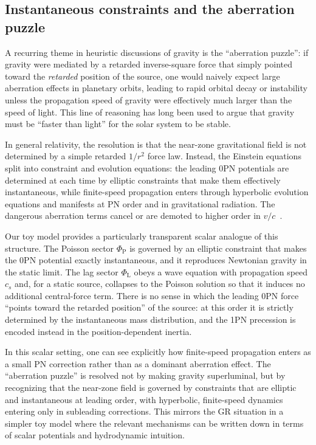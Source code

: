 \documentclass[11pt]{article}
\newcommand{\cS}{c_s}
\newcommand{\PhiP}{\Phi_{\mathrm{P}}}
\newcommand{\PhiL}{\Phi_{\mathrm{L}}}
\begin{document}
\subsection{Instantaneous constraints and the aberration puzzle}
\label{sec:discussion_aberration}

A recurring theme in heuristic discussions of gravity is the ``aberration puzzle'': if gravity were mediated by a retarded inverse-square force that simply pointed toward the \emph{retarded} position of the source, one would naively expect large aberration effects in planetary orbits, leading to rapid orbital decay or instability unless the propagation speed of gravity were effectively much larger than the speed of light. This line of reasoning has long been used to argue that gravity must be ``faster than light'' for the solar system to be stable.

In general relativity, the resolution is that the near-zone gravitational field is not determined by a simple retarded $1/r^2$ force law. Instead, the Einstein equations split into constraint and evolution equations: the leading 0PN potentials are determined at each time by elliptic constraints that make them effectively instantaneous, while finite-speed propagation enters through hyperbolic evolution equations and manifests at PN order and in gravitational radiation. The dangerous aberration terms cancel or are demoted to higher order in $v/c$~\cite{Carlip:2000jd}.

Our toy model provides a particularly transparent scalar analogue of this structure. The Poisson sector $\PhiP$ is governed by an elliptic constraint that makes the 0PN potential exactly instantaneous, and it reproduces Newtonian gravity in the static limit. The lag sector $\PhiL$ obeys a wave equation with propagation speed $\cS$ and, for a static source, collapses to the Poisson solution so that it induces no additional central-force term. There is no sense in which the leading 0PN force ``points toward the retarded position'' of the source: at this order it is strictly determined by the instantaneous mass distribution, and the 1PN precession is encoded instead in the position-dependent inertia.

In this scalar setting, one can see explicitly how finite-speed propagation enters as a small PN correction rather than as a dominant aberration effect. The ``aberration puzzle'' is resolved not by making gravity superluminal, but by recognizing that the near-zone field is governed by constraints that are elliptic and instantaneous at leading order, with hyperbolic, finite-speed dynamics entering only in subleading corrections. This mirrors the GR situation in a simpler toy model where the relevant mechanisms can be written down in terms of scalar potentials and hydrodynamic intuition.
\end{document}
